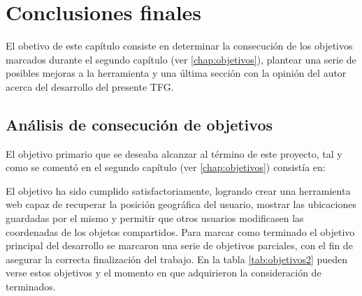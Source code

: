\chapter{Conclusiones finales}
\label{chap:conclusiones}
El obetivo de este capítulo consiste en determinar la consecución de los objetivos marcados durante el segundo capítulo (ver \ref{chap:objetivos}), plantear una serie de posibles mejoras a la herramienta y una última sección con la opinión del autor acerca del desarrollo del presente \ac{TFG}.

\section{Análisis de consecución de objetivos}
El objetivo primario que se deseaba alcanzar al término de este proyecto, tal y como se comentó en el segundo capítulo (ver \ref{chap:objetivos}) consistía en:


El objetivo ha sido cumplido satisfactoriamente, logrando crear una herramienta web capaz de recuperar la posición geográfica del usuario, mostrar las ubicaciones guardadas por el mismo y permitir que otros usuarios modificasen las coordenadas de los objetos compartidos. Para marcar como terminado el objetivo principal del desarrollo se marcaron una serie de objetivos parciales, con el fin de asegurar la correcta finalización del trabajo. En la tabla \ref{tab:objetivos2} pueden verse estos objetivos y el momento en que adquirieron la consideración de terminados.

